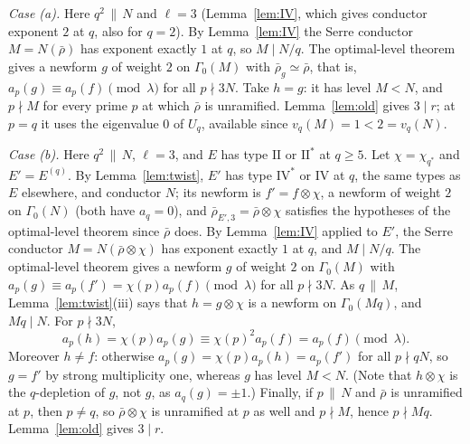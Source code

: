 \documentclass[11pt]{amsart}
\theoremstyle{definition}
\begin{document}
\medskip\noindent\emph{Case (a).} Here $q^2\,\|\,N$ and $\ell=3$ (Lemma~\ref{lem:IV}, which gives conductor exponent $2$ at $q$, also for $q=2$). By Lemma~\ref{lem:IV} the Serre conductor $M=N(\bar\rho)$ has exponent exactly $1$ at $q$, so $M\mid N/q$. The optimal-level theorem gives a newform $g$ of weight $2$ on $\Gamma_0(M)$ with $\bar\rho_g\simeq\bar\rho$, that is, $a_p(g)\equiv a_p(f)\pmod\lambda$ for all $p\nmid 3N$. Take $h=g$: it has level $M<N$, and $p\nmid M$ for every prime $p$ at which $\bar\rho$ is unramified. Lemma~\ref{lem:old} gives $3\mid r$; at $p=q$ it uses the eigenvalue $0$ of $U_q$, available since $v_q(M)=1<2=v_q(N)$.

\medskip\noindent\emph{Case (b).} Here $q^2\,\|\,N$, $\ell=3$, and $E$ has type $\mathrm{II}$ or $\mathrm{II}^*$ at $q\ge5$. Let $\chi=\chi_{q^*}$ and $E'=E^{(q)}$. By Lemma~\ref{lem:twist}, $E'$ has type $\mathrm{IV}^*$ or $\mathrm{IV}$ at $q$, the same types as $E$ elsewhere, and conductor $N$; its newform is $f'=f\otimes\chi$, a newform of weight $2$ on $\Gamma_0(N)$ (both have $a_q=0$), and $\bar\rho_{E',3}=\bar\rho\otimes\chi$ satisfies the hypotheses of the optimal-level theorem since $\bar\rho$ does. By Lemma~\ref{lem:IV} applied to $E'$, the Serre conductor $M=N(\bar\rho\otimes\chi)$ has exponent exactly $1$ at $q$, and $M\mid N/q$. The optimal-level theorem gives a newform $g$ of weight $2$ on $\Gamma_0(M)$ with $a_p(g)\equiv a_p(f')=\chi(p)a_p(f)\pmod\lambda$ for all $p\nmid 3N$. As $q\,\|\,M$, Lemma~\ref{lem:twist}(iii) says that $h=g\otimes\chi$ is a newform on $\Gamma_0(Mq)$, and $Mq\mid N$. For $p\nmid 3N$,
\[
a_p(h)=\chi(p)a_p(g)\equiv\chi(p)^2a_p(f)=a_p(f)\pmod\lambda .
\]
Moreover $h\ne f$: otherwise $a_p(g)=\chi(p)a_p(h)=a_p(f')$ for all $p\nmid qN$, so $g=f'$ by strong multiplicity one, whereas $g$ has level $M<N$. (Note that $h\otimes\chi$ is the $q$-depletion of $g$, not $g$, as $a_q(g)=\pm1$.) Finally, if $p\,\|\,N$ and $\bar\rho$ is unramified at $p$, then $p\ne q$, so $\bar\rho\otimes\chi$ is unramified at $p$ as well and $p\nmid M$, hence $p\nmid Mq$. Lemma~\ref{lem:old} gives $3\mid r$.
\end{document}
